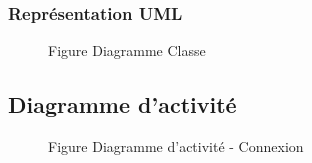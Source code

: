 \documentclass[a4paper, 11pt]{article}
\begin{document}
	\subsubsection{ Représentation UML}
	\begin{figure}[h]
        \caption{Figure Diagramme Classe}
        \label{fig-diag-class-1}
        \end{figure}
	\clearpage
        \subsection{Diagramme d'activité}
        \begin{figure}[h]
        \caption{Figure Diagramme d'activité - Connexion}
        \label{fig-diag-activite-connexion}
        \end{figure}
\end{document}

